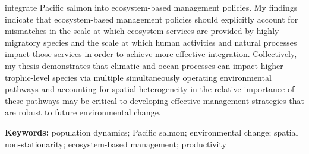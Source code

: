 integrate Pacific salmon into ecosystem-based management policies. My findings
indicate that ecosystem-based management policies should explicitly account for
mismatches in the scale at which ecosystem services are provided by highly
migratory species and the scale at which human activities and natural processes
impact those services in order to achieve more effective integration.
Collectively, my thesis demonstrates that climatic and ocean processes can
impact higher-trophic-level species via multiple simultaneously operating
environmental pathways and accounting for spatial heterogeneity in the relative
importance of these pathways may be critical to developing effective management
strategies that are robust to future environmental change.

\noindent \textbf{Keywords:} population dynamics; Pacific salmon; environmental
change; spatial non-stationarity; ecosystem-based management; productivity

